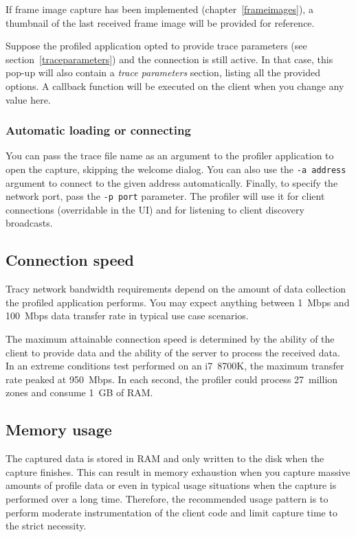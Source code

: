 \documentclass[hidelinks,titlepage,a4paper]{article}
\begin{document}
If frame image capture has been implemented (chapter~\ref{frameimages}), a thumbnail of the last received frame image will be provided for reference.

Suppose the profiled application opted to provide trace parameters (see section~\ref{traceparameters}) and the connection is still active. In that case, this pop-up will also contain a \emph{trace parameters} section, listing all the provided options. A callback function will be executed on the client when you change any value here.

\subsubsection{Automatic loading or connecting}

You can pass the trace file name as an argument to the profiler application to open the capture, skipping the welcome dialog. You can also use the \texttt{-a address} argument to connect to the given address automatically. Finally, to specify the network port, pass the \texttt{-p port} parameter. The profiler will use it for client connections (overridable in the UI) and for listening to client discovery broadcasts.

\subsection{Connection speed}

Tracy network bandwidth requirements depend on the amount of data collection the profiled application performs. You may expect anything between 1~Mbps and 100~Mbps data transfer rate in typical use case scenarios.

The maximum attainable connection speed is determined by the ability of the client to provide data and the ability of the server to process the received data. In an extreme conditions test performed on an i7~8700K, the maximum transfer rate peaked at 950~Mbps. In each second, the profiler could process 27~million zones and consume 1~GB of RAM.

\subsection{Memory usage}

The captured data is stored in RAM and only written to the disk when the capture finishes. This can result in memory exhaustion when you capture massive amounts of profile data or even in typical usage situations when the capture is performed over a long time. Therefore, the recommended usage pattern is to perform moderate instrumentation of the client code and limit capture time to the strict necessity.
\end{document}
